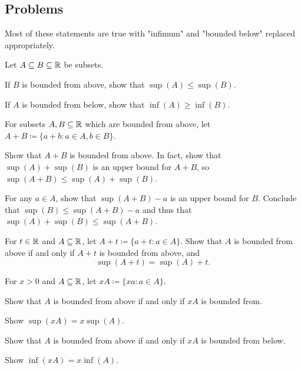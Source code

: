 \documentclass[../notes.tex]{subfiles}
\begin{document}
\subsection{Problems}
Most of these statements are true with "infimum" and "bounded below" replaced appropriately. 

\begin{homework}
    Let $A\subseteq B\subseteq \mathbb R$ be subsets.
    \begin{listalph}
        \item If $B$ is bounded from above, show that $\sup(A)\leq \sup(B)$.
        \item If $A$ is bounded from below, show that $\inf(A) \geq \inf(B)$. 
    \end{listalph}
\end{homework}

\begin{homework}
    For subsets $A,B\subseteq \mathbb R$ which are bounded from above, let $A+B\coloneqq\{a+b: a\in A, b\in B\}$. 
    \begin{listalph}
        \item Show that $A+B$ is bounded from above. In fact, show that $\sup(A)+\sup(B)$ is an upper bound for $A+B$, so $\sup(A+B)\le\sup(A)+\sup(B)$.
        \item For any $a\in A$, show that $\sup(A+B)-a$ is an upper bound for $B$. Conclude that $\sup(B)\le\sup(A+B)-a$ and thus that $\sup(A)+\sup(B)\le\sup(A+B)$.
    \end{listalph}    
\end{homework}

\begin{homework} 
    For $t\in \mathbb R$ and $A\subseteq \mathbb R$, let $A+t\coloneqq\{a+t : a\in A\}$. Show that $A$ is bounded from above if and only if $A+t$ is bounded from above, and 
    \[ \sup(A+t) = \sup(A)+t.\]
\end{homework}

\begin{homework}
    For $x>0$ and $A\subseteq \mathbb R$, let $xA \coloneqq \{xa : a\in A\}$.
    \begin{listalph}
         \item Show that $A$ is bounded from above if and only if $xA$ is bounded from.
         \item Show $\sup(xA)=x\sup(A)$.
         \item Show that $A$ is bounded from above if and only if $xA$ is bounded from below.
         \item Show $\inf(xA)=x\inf(A)$.
    \end{listalph}
\end{homework}
\end{document}
